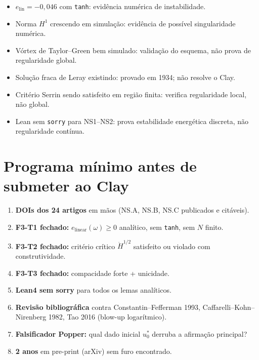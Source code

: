 \documentclass[12pt,a4paper]{article}
\theoremstyle{definition}
\begin{document}
\begin{itemize}
  \item $e_{\mathrm{lin}} = -0{,}046$ com \texttt{tanh}:
        evidência numérica de instabilidade.
  \item Norma $H^1$ crescendo em simulação:
        evidência de possível singularidade numérica.
  \item Vórtex de Taylor--Green bem simulado:
        validação do esquema, não prova de regularidade global.
  \item Solução fraca de Leray existindo:
        provado em 1934; não resolve o Clay.
  \item Critério Serrin sendo satisfeito em região finita:
        verifica regularidade local, não global.
  \item Lean sem \texttt{sorry} para NS1--NS2:
        prova estabilidade energética discreta, não regularidade contínua.
\end{itemize}

\section{Programa mínimo antes de submeter ao Clay}

\begin{enumerate}
  \item \textbf{DOIs dos 24 artigos} em mãos (NS.A, NS.B, NS.C
        publicados e citáveis).
  \item \textbf{F3-T1 fechado:} $e_{\mathrm{linear}}(\omega) \ge 0$
        analítico, sem \texttt{tanh}, sem $N$ finito.
  \item \textbf{F3-T2 fechado:} critério crítico $\dot H^{1/2}$
        satisfeito ou violado com construtividade.
  \item \textbf{F3-T3 fechado:} compacidade forte + unicidade.
  \item \textbf{Lean4 sem sorry} para todos os lemas analíticos.
  \item \textbf{Revisão bibliográfica} contra Constantin--Fefferman 1993,
        Caffarelli--Kohn--Nirenberg 1982, Tao 2016 (blow-up logarítmico).
  \item \textbf{Falsificador Popper:} qual dado inicial
        $u_0^*$ derruba a afirmação principal?
  \item \textbf{2 anos} em pre-print (arXiv) sem furo encontrado.
\end{enumerate}

\end{document}
